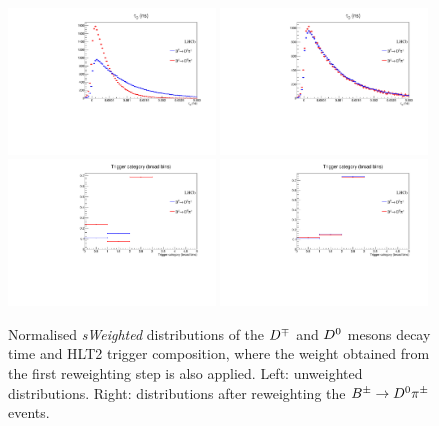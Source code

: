 \begin{figure}[t]
  \begin{center}
   \includegraphics[width=0.49\textwidth]{AA-Appdx-OSTaggers/figs/DTAU_BuVSBd_Unweighted.pdf}
   \includegraphics[width=0.49\textwidth]{AA-Appdx-OSTaggers/figs/DTAU_BuVSBd_Weighted.pdf} \\
   \includegraphics[width=0.49\textwidth]{AA-Appdx-OSTaggers/figs/TRIGCATB_BuVSBd_Unweighted.pdf}
   \includegraphics[width=0.49\textwidth]{AA-Appdx-OSTaggers/figs/TRIGCATB_BuVSBd_Weighted.pdf} \\
  \end{center}
  \vspace{-2mm}
  \caption{Normalised \emph{sWeighted} distributions of the $D^\mp$ and $D^0$ mesons decay time and HLT2 trigger composition, where the weight obtained from the first reweighting step is also applied. Left: unweighted distributions. Right: distributions after reweighting the $B^\pm\rightarrow D^0\pi^\pm$ events.}
  \label{fig:reweightingOSsecond}
\end{figure}

